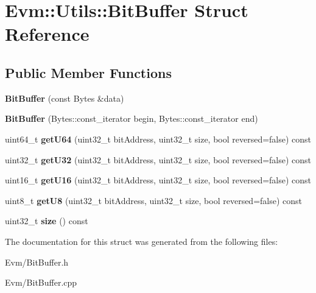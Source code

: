 \hypertarget{struct_evm_1_1_utils_1_1_bit_buffer}{}\section{Evm\+:\+:Utils\+:\+:Bit\+Buffer Struct Reference}
\label{struct_evm_1_1_utils_1_1_bit_buffer}
\subsection*{Public Member Functions}
\begin{DoxyCompactItemize}
\item 
\mbox{\label{struct_evm_1_1_utils_1_1_bit_buffer_af62bf038f198244dcb02a97ebb31d0e1}} 
{\bfseries Bit\+Buffer} (const Bytes \&data)
\item 
\mbox{\label{struct_evm_1_1_utils_1_1_bit_buffer_a83e441743de70d72d42e73733c7d76d4}} 
{\bfseries Bit\+Buffer} (Bytes\+::const\+\_\+iterator begin, Bytes\+::const\+\_\+iterator end)
\item 
\mbox{\label{struct_evm_1_1_utils_1_1_bit_buffer_af0c9d384c109f2daa55e9c4a02dc332f}} 
uint64\+\_\+t {\bfseries get\+U64} (uint32\+\_\+t bit\+Address, uint32\+\_\+t size, bool reversed=false) const
\item 
\mbox{\label{struct_evm_1_1_utils_1_1_bit_buffer_a7727b3e57c89a4d55a513ec2ce75cc0b}} 
uint32\+\_\+t {\bfseries get\+U32} (uint32\+\_\+t bit\+Address, uint32\+\_\+t size, bool reversed=false) const
\item 
\mbox{\label{struct_evm_1_1_utils_1_1_bit_buffer_a06b8a0a12f532de218bc17cc3b1b97e2}} 
uint16\+\_\+t {\bfseries get\+U16} (uint32\+\_\+t bit\+Address, uint32\+\_\+t size, bool reversed=false) const
\item 
\mbox{\label{struct_evm_1_1_utils_1_1_bit_buffer_ac6ecaf7a3617b9ea09c057d2d039100a}} 
uint8\+\_\+t {\bfseries get\+U8} (uint32\+\_\+t bit\+Address, uint32\+\_\+t size, bool reversed=false) const
\item 
\mbox{\label{struct_evm_1_1_utils_1_1_bit_buffer_a1f58c76a7bdb52e1fa4ff244c137de10}} 
uint32\+\_\+t {\bfseries size} () const
\end{DoxyCompactItemize}


The documentation for this struct was generated from the following files\+:\begin{DoxyCompactItemize}
\item 
Evm/Bit\+Buffer.\+h\item 
Evm/Bit\+Buffer.\+cpp\end{DoxyCompactItemize}
